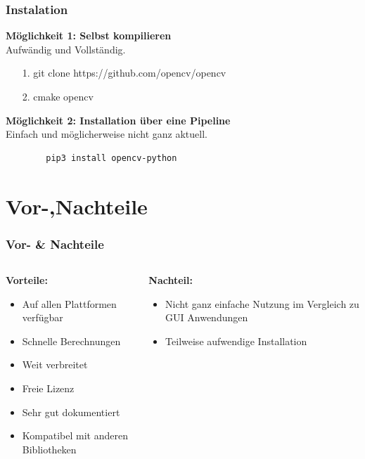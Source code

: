 \documentclass{beamer}
\begin{document}
\begin{frame} [fragile]
\frametitle{Instalation}
	\textbf{Möglichkeit 1: Selbst kompilieren}\\
	Aufwändig und Vollständig.
		\begin{itemize}
			\item  [1.] git clone https://github.com/opencv/opencv
			\item [2.] cmake opencv
		\end{itemize}
	\textbf{Möglichkeit 2: Installation über eine Pipeline}\\
	Einfach und möglicherweise nicht ganz aktuell.\\
\lstset{style=myStyle}
\begin{lstlisting}
		pip3 install opencv-python 
\end{lstlisting}
\cite{Howse2015}
\end{frame}
\section{Vor-,Nachteile}
\begin{frame} \frametitle{Vor- \& Nachteile}
	\begin{columns}
		\begin{column}{0.5\textwidth}
			\textbf{Vorteile:}
			\begin{itemize}
				\item Auf allen Plattformen verfügbar
				\item Schnelle Berechnungen
				\item Weit verbreitet
				\item Freie Lizenz
				\item Sehr gut dokumentiert
				\item Kompatibel mit anderen Bibliotheken
			\end{itemize}
		\end{column}
		
		
		\begin{column}{0.5\textwidth}
			\textbf{Nachteil:}
			\begin{itemize}
				\item Nicht ganz einfache Nutzung im Vergleich zu GUI Anwendungen
				\item Teilweise aufwendige Installation
			\end{itemize}
		\end{column}
	\end{columns}
\end{frame}
\end{document}
